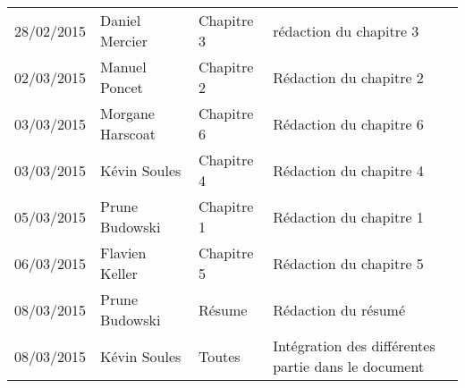 \small
\begin{tabular}{|p{1.9cm}| >{\raggedright}p{2.5cm}|p{2.5cm}|p{8.5cm}|}
  \hline
  \rowcolor{Gainsboro} \color{Navy}{\bfseries Date}  & \color{Navy}{\bfseries Auteur} & \color{Navy}{\bfseries Section(s)}  &\color{Navy}{\bfseries Commentaires} \\
  \hline
  28/02/2015 & Daniel Mercier & Chapitre 3 & rédaction du chapitre 3\\
  \hline
  02/03/2015 & Manuel Poncet & Chapitre 2 & Rédaction du chapitre 2\\
  \hline
  03/03/2015 & Morgane Harscoat & Chapitre 6 & Rédaction du chapitre 6\\
  \hline
  03/03/2015 & Kévin Soules & Chapitre 4 & Rédaction du chapitre 4\\
  \hline
  05/03/2015 & Prune Budowski & Chapitre 1 & Rédaction du chapitre 1\\
  \hline
  06/03/2015 & Flavien Keller & Chapitre 5 & Rédaction du chapitre 5\\
  \hline
  08/03/2015 & Prune Budowski & Résume & Rédaction du résumé\\
  \hline
  08/03/2015 & Kévin Soules & Toutes & Intégration des différentes partie dans le document\\
  \hline
\end{tabular}
\normalsize
